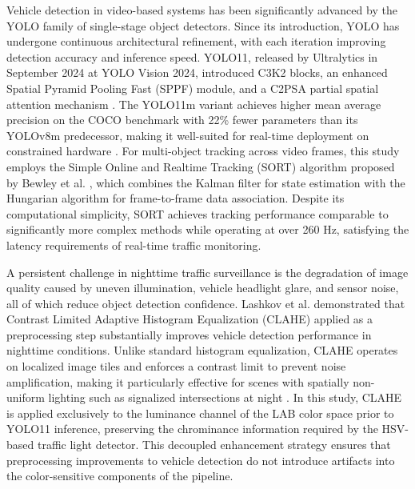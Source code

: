 Vehicle detection in video-based systems has been significantly advanced by the YOLO family of single-stage object detectors. Since its introduction, YOLO has undergone continuous architectural refinement, with each iteration improving detection accuracy and inference speed. YOLO11, released by Ultralytics in September 2024 at YOLO Vision 2024, introduced C3K2 blocks, an enhanced Spatial Pyramid Pooling Fast (SPPF) module, and a C2PSA partial spatial attention mechanism \cite{ultralytics2024}. The YOLO11m variant achieves higher mean average precision on the COCO benchmark with 22\% fewer parameters than its YOLOv8m predecessor, making it well-suited for real-time deployment on constrained hardware \cite{ultralytics2024}. For multi-object tracking across video frames, this study employs the Simple Online and Realtime Tracking (SORT) algorithm proposed by Bewley et al. \cite{bewley2016}, which combines the Kalman filter for state estimation with the Hungarian algorithm for frame-to-frame data association. Despite its computational simplicity, SORT achieves tracking performance comparable to significantly more complex methods while operating at over 260 Hz, satisfying the latency requirements of real-time traffic monitoring.

A persistent challenge in nighttime traffic surveillance is the degradation of image quality caused by uneven illumination, vehicle headlight glare, and sensor noise, all of which reduce object detection confidence. Lashkov et al. \cite{lashkov2023} demonstrated that Contrast Limited Adaptive Histogram Equalization (CLAHE) applied as a preprocessing step substantially improves vehicle detection performance in nighttime conditions. Unlike standard histogram equalization, CLAHE operates on localized image tiles and enforces a contrast limit to prevent noise amplification, making it particularly effective for scenes with spatially non-uniform lighting such as signalized intersections at night \cite{zuiderveld1994, chen2023clahe}. In this study, CLAHE is applied exclusively to the luminance channel of the LAB color space prior to YOLO11 inference, preserving the chrominance information required by the HSV-based traffic light detector. This decoupled enhancement strategy ensures that preprocessing improvements to vehicle detection do not introduce artifacts into the color-sensitive components of the pipeline.

